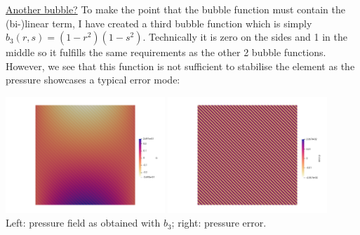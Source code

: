 \vspace{.5cm}
\underline{Another bubble?} 
To make the point that the bubble function must contain the (bi-)linear term, 
I have created a third bubble function which is simply $b_3(r,s)=(1-r^2)(1-s^2)$.
Technically it is zero on the sides and 1 in the middle so it fulfills the 
same requirements as the other 2 bubble functions. 
However, we see that this function is not sufficient to stabilise the element as the pressure 
showcases a typical error mode:
\begin{center}
\includegraphics[width=6cm]{python_codes/fieldstone_72/results/mms/p_b3}
\includegraphics[width=6cm]{python_codes/fieldstone_72/results/mms/p_error_b3}\\
{\captionfont Left: pressure field as obtained with $b_3$; right: pressure error.}
\end{center}

\vspace{.5cm}

